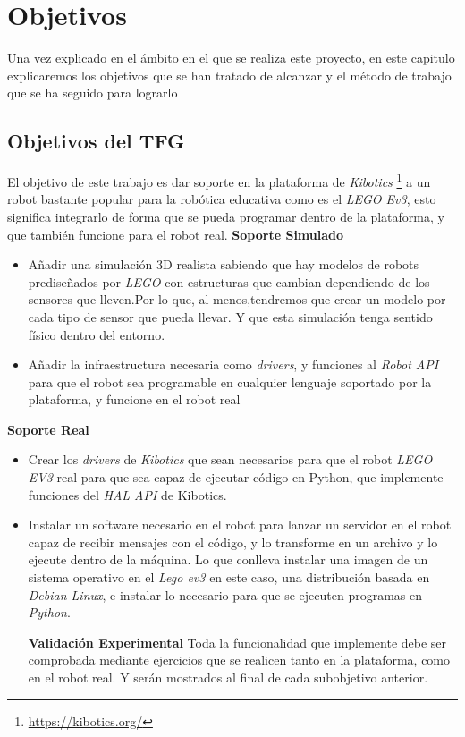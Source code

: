 \chapter{Objetivos}\label{chap:objetivos}
Una vez explicado en el ámbito en el que se realiza este proyecto, en este capitulo explicaremos los objetivos que se han tratado de alcanzar y el método de trabajo que se ha seguido para lograrlo

\section{Objetivos del TFG}
El objetivo de este trabajo es dar soporte en la plataforma de \textit{Kibotics} \footnote{\url{https://kibotics.org/}} a un robot bastante popular para la robótica educativa como es el \textit{LEGO Ev3}, esto significa integrarlo de forma que se pueda programar dentro de la plataforma, y que también funcione para el robot real.\newline 
\textbf{Soporte Simulado}
\begin{itemize}
    \item Añadir una simulación 3D realista sabiendo que hay modelos de robots prediseñados por \textit{LEGO} con estructuras que cambian dependiendo de los sensores que lleven.Por lo que, al menos,tendremos que crear un modelo por cada tipo de sensor que pueda llevar. Y que esta simulación tenga sentido físico dentro del entorno.
        
    \item Añadir la infraestructura necesaria como \textit{drivers}, y funciones al \textit{Robot API} para que el robot sea programable en cualquier lenguaje soportado por la plataforma, y funcione en el robot real
 
    
\end{itemize}
\textbf{Soporte Real}
\begin{itemize}
    \item Crear los \textit{drivers} de \textit{Kibotics} que sean necesarios para que el robot \textit{LEGO EV3} real para que sea capaz de ejecutar código en Python, que implemente funciones del \textit{HAL API} de Kibotics.
    
        \item Instalar un software necesario en el robot para lanzar un servidor en el robot capaz de recibir mensajes con el código, y lo transforme en un archivo y lo ejecute dentro de la máquina. Lo que conlleva instalar una imagen de un sistema operativo en el \textit{Lego ev3} en este caso, una distribución basada en \textit{Debian Linux}, e instalar lo necesario para que se ejecuten programas en \textit{Python}.
    
\textbf{Validación Experimental}\newline
Toda la funcionalidad que implemente debe ser comprobada mediante ejercicios que se realicen tanto en la plataforma, como en el robot real. Y serán mostrados al final de cada subobjetivo anterior.
    
\end{itemize}

